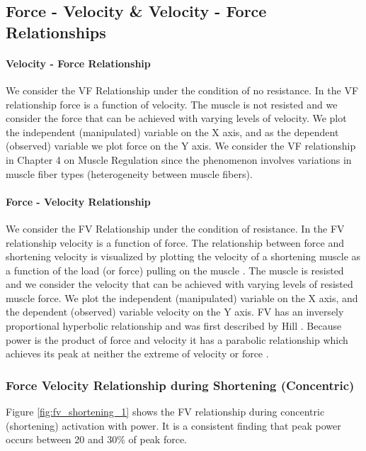 \subsection{Force - Velocity \& Velocity - Force Relationships}

\paragraph{Velocity - Force Relationship}
We consider the VF Relationship under the condition of no resistance. In the VF relationship force is a function of velocity. The muscle is not resisted \footnotemark{} and we consider the force that can be achieved with varying levels of velocity. We plot the independent (manipulated) variable on the X axis, and as the dependent (observed) variable we plot force on the Y axis. We consider the VF relationship in Chapter 4 on Muscle Regulation since the phenomenon involves variations in muscle fiber types (heterogeneity between muscle fibers).

\paragraph{Force - Velocity Relationship}
We consider the FV Relationship under the condition of resistance. In the FV relationship velocity is a function of force. The relationship between force and shortening velocity is visualized by plotting the velocity of a shortening muscle as a function of the load (or force) pulling on the muscle \cite{seow_molecular_2022}. The muscle is resisted and we consider the velocity that can be achieved with varying levels of resisted muscle force. We plot the independent (manipulated) variable on the X axis, and the dependent (observed) variable velocity on the Y axis. FV has an inversely proportional hyperbolic relationship and was first described by Hill \cite{seow_hills_2013}. Because power is the product of force and velocity it has a parabolic relationship which achieves its peak at neither the extreme of velocity or force \cite{seow_hills_2013}. 

\subsubsection{Force Velocity Relationship during Shortening (Concentric)}
Figure \ref{fig:fv_shortening_1} shows the FV relationship during concentric (shortening) activation with power. It is a consistent finding that peak power occurs between 20 and 30\% of peak force.

